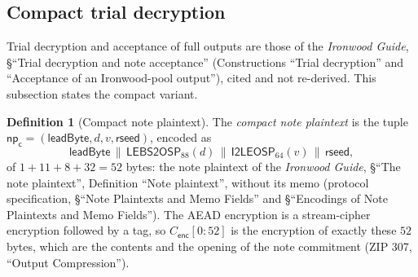 \documentclass[11pt,a4paper]{article}
\theoremstyle{definition}
\newtheorem{definition}[theorem]{Definition}
\begin{document}
\subsection{Compact trial decryption}\label{sec:compact-decrypt}

Trial decryption and acceptance of full outputs are those of the
\emph{Ironwood Guide}, \S``Trial decryption and note acceptance''
(Constructions ``Trial decryption'' and ``Acceptance of an Ironwood-pool
output''), cited and not re-derived. This subsection states the compact
variant.

\begin{definition}[Compact note plaintext]\label{def:compact-np}
The \emph{compact note plaintext} is the tuple
$\mathsf{np}_{\mathsf{c}} = (\mathsf{leadByte}, d, v, \mathsf{rseed})$,
encoded as
\[
  \mathsf{leadByte} \,\|\, \mathsf{LEBS2OSP}_{88}(d) \,\|\,
  \mathsf{I2LEOSP}_{64}(v) \,\|\, \mathsf{rseed},
\]
of $1 + 11 + 8 + 32 = 52$ bytes: the note plaintext of the \emph{Ironwood
Guide}, \S``The note plaintext'', Definition ``Note plaintext'', without its
memo (protocol
specification, \S``Note Plaintexts and Memo Fields'' and \S``Encodings of
Note Plaintexts and Memo Fields''). The AEAD encryption is a stream-cipher
encryption followed by a tag, so $C_{\mathsf{enc}}[0{:}52]$ is the
encryption of exactly these $52$ bytes, which are the contents and the
opening of the note commitment (ZIP 307, ``Output Compression'').
\end{definition}
\end{document}

